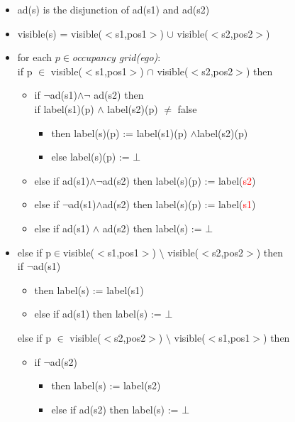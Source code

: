 \begin{itemize}
\item ad(s) is the disjunction of ad(s1) and ad(s2)
\item visible(s) = visible($<$s1,pos1$>$) $\cup$ visible($<$s2,pos2$>$)
\item for each $p\in $\textit{occupancy grid(ego)}:  \\
if p $\in$ visible($<$s1,pos1$>$) $\cap$ visible($<$s2,pos2$>$) then
\begin{itemize}
\item if $\neg$ad(s1)$\land\neg$ ad(s2) then\\
if label(s1)(p) $\land$ label(s2)(p) $\not=$ false 
\begin{itemize}
\item[] then label(s)(p) := label(s1)(p) $\land $label(s2)(p)
\item[] else label(s)(p) := $\bot$
\end{itemize}
\item[] else if ad(s1)$\land\neg$ad(s2) then label(s)(p) := label(\textcolor{red}{s2})
\item[] else if $\neg$ad(s1)$\land$ad(s2) then label(s)(p) := label(\textcolor{red}{s1})
\item[] else if ad(s1) $\land$ ad(s2) then label(s) := $\bot$
\end{itemize}
\item[] else if p$\in$visible($<$s1,pos1$>$) $\setminus$ visible($<$s2,pos2$>$) then\\	
if $\neg$ad(s1)
\begin{itemize}
    \item[] then label(s) := label(s1)
	\item[] else if ad(s1) then label(s) := $\bot$
	\end{itemize}
	else if p $\in$ visible($<$s2,pos2$>$) $\setminus$ visible($<$s1,pos1$>$) then
	\begin{itemize}
	\item[] if $\neg$ad(s2) 
	\begin{itemize}
	    \item[]then label(s) := label(s2)
	\item[] else if ad(s2) then label(s) := $\bot$
    \end{itemize}
    \end{itemize}
\end{itemize}
